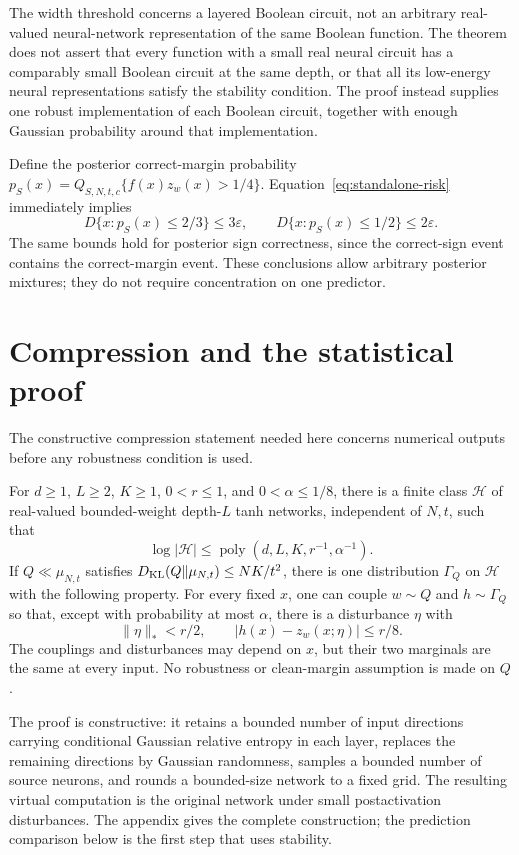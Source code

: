 The width threshold concerns a layered Boolean circuit, not an arbitrary
real-valued neural-network representation of the same Boolean function.
The theorem does not assert that every function with a small real neural
circuit has a comparably small Boolean circuit at the same depth, or that
all its low-energy neural representations satisfy the stability condition.
The proof instead supplies one robust implementation of each Boolean
circuit, together with enough Gaussian probability around that implementation.

Define the posterior correct-margin probability
$p_S(x)=Q_{S,N,t,c}\{f(x)z_w(x)>1/4\}$.
Equation~\eqref{eq:standalone-risk} immediately implies
\[
 D\{x:p_S(x)\le2/3\}\le3\varepsilon,
 \qquad D\{x:p_S(x)\le1/2\}\le2\varepsilon.
\]
The same bounds hold for posterior sign correctness, since the correct-sign
event contains the correct-margin event. These conclusions allow arbitrary
posterior mixtures; they do not require concentration on one predictor.

\section{Compression and the statistical proof}
\label{sec:theory-statistical}

The constructive compression statement needed here concerns numerical
outputs before any robustness condition is used.

\begin{lemma}
\label{lem:raw-entropy-compression}
For $d\ge1$, $L\ge2$, $K\ge1$, $0<r\le1$, and
$0<\alpha\le1/8$, there is a finite class $\mathcal H$ of real-valued
bounded-weight depth-$L$ tanh networks, independent of $N,t$, such that
\[
 \log|\mathcal H|\le
       \operatorname{poly}(d,L,K,r^{-1},\alpha^{-1}).
\]
If $Q\ll\mu_{N,t}$ satisfies
$D_{\rm KL}(Q\Vert\mu_{N,t})\le NK/t^2$, there is one distribution
$\Gamma_Q$ on $\mathcal H$ with the following property. For every fixed
$x$, one can couple $w\sim Q$ and $h\sim\Gamma_Q$ so that, except with
probability at most $\alpha$, there is a disturbance $\eta$ with
\[
 \|\eta\|_*<r/2,\qquad
 |h(x)-z_w(x;\eta)|\le r/8.
\]
The couplings and disturbances may depend on $x$, but their two marginals
are the same at every input. No robustness or clean-margin assumption is
made on $Q$.
\end{lemma}

The proof is constructive: it retains a bounded number of input directions
carrying conditional Gaussian relative entropy in each layer, replaces the
remaining directions by Gaussian randomness, samples a bounded number of
source neurons, and rounds a bounded-size network to a fixed grid.
The resulting virtual computation is the original network under small
postactivation disturbances. The appendix gives the complete construction;
the prediction comparison below is the first step that uses stability.

